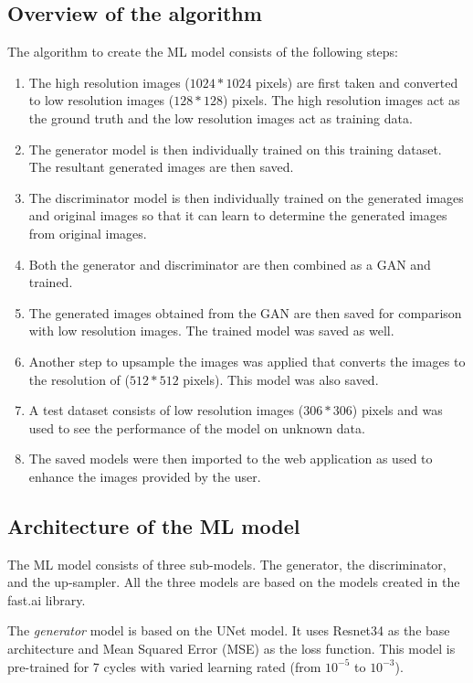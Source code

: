 \documentclass[conference]{IEEEtran}
\begin{document}
		\subsection{Overview of the algorithm}
			The algorithm to create the ML model consists of the following steps:
				\begin{enumerate}
					\item The high resolution images ($1024 * 1024$ pixels)\cite{b8} are first taken and converted to low resolution images ($128 * 128$) pixels. The high resolution images act as the ground truth and the low resolution images act as training data.
					\item The generator model is then individually trained on this training dataset. The resultant generated images are then saved.
					\item The discriminator model is then individually trained on the generated images and original images so that it can learn to determine the generated images from original images.
					\item Both the generator and discriminator are then combined as a GAN and trained.
					\item The generated images obtained from the GAN are then saved for comparison with low resolution images. The trained model was saved as well.
					\item Another step to upsample the images was applied that converts the images to the resolution of ($512 * 512$ pixels). This model was also saved.
					\item A test dataset \cite{b9} consists of low resolution images ($306 * 306$) pixels and was used to see the performance of the model on unknown data.
					\item The saved models were then imported to the web application as used to enhance the images provided by the user.
				\end{enumerate}
		\subsection{Architecture of the ML model}
			The ML model consists of three sub-models. The generator, the discriminator, and the up-sampler. All the three models are based on the models created in the fast.ai library\cite{b7}.
			
			\par The \emph{generator} model is based on the UNet model\cite{b10}. It uses Resnet34\cite{b11} as the base architecture and Mean Squared Error (MSE)\cite{b12} as the loss function. This model is pre-trained for 7 cycles with varied learning rated (from $10^{-5}$ to $10^{-3}$).
			
\end{document}
